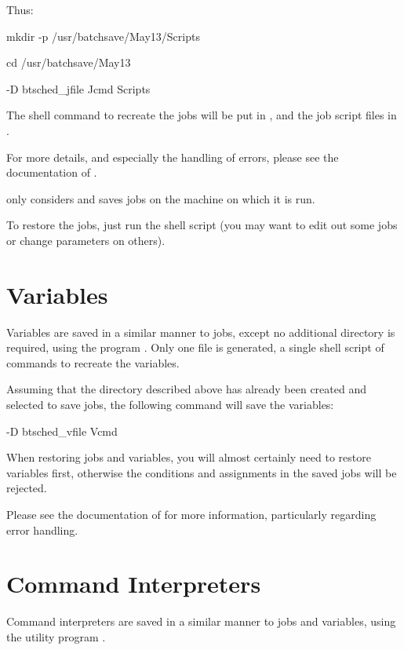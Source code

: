 Thus:

\begin{expara}

mkdir -p /usr/batchsave/May13/Scripts

cd /usr/batchsave/May13

\XbCjlistName{} -D \spooldirname{} btsched\_jfile Jcmd Scripts

\end{expara}

The shell command to recreate the jobs will be put in , and the job script files in .

For more details, and especially the handling of errors, please see the documentation of \PrXbCjlist.

\PrXbCjlist{} only considers and saves jobs on the machine on which it is run.

To restore the jobs, just run the shell script  (you may want to edit out some jobs or change parameters
on others).

\section{Variables}
Variables are saved in a similar manner to jobs, except no additional directory is required, using the program
\PrXbCvlist. Only one file is generated, a single shell script of \PrBtvar{} commands to recreate the variables.

Assuming that the  directory described above has already been created and selected to save jobs, the
following command will save the variables:

\begin{expara}

\XbCvlistName{} -D \spooldirname{} btsched\_vfile Vcmd

\end{expara}

When restoring jobs and variables, you will almost certainly need to restore variables first, otherwise the conditions and assignments in
the saved jobs will be rejected.

Please see the documentation of \PrXbCvlist{} for more information, particularly regarding error handling.

\section{Command Interpreters}
Command interpreters are saved in a similar manner to jobs and variables, using the utility program \PrXbCiconv{}.

